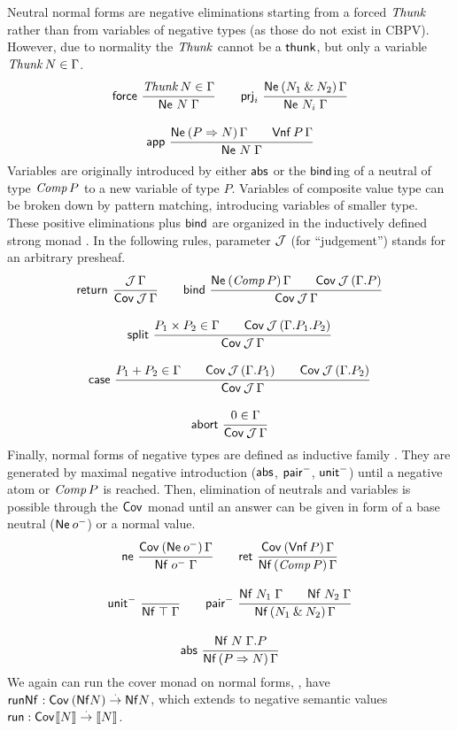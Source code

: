 \documentclass[sigplan,screen,fleqn]{acmart}
\begin{document}
Neutral normal forms  are negative eliminations
starting from a forced $\mathit{Thunk}$ rather than from variables of negative
types (as those do not exist in CBPV).  However, due to normality
the $\mathit{Thunk}$ cannot be a $\mathsf{thunk}$, but only a variable
$\mathit{Thunk}\,N \in \Gamma$.
\begin{gather*}
  \nru{\tforce}{\Thunk N \in \Gamma}{\Ne N \Gamma}
\qquad
  \nru{\tprj_i}
      {\NeP {N_1 \ntimes N_2} \Gamma}
      {\Ne {N_i} \Gamma}
\\[2ex]
  \nru{\tapp}
      {\NeP {P \To N} \Gamma \qquad \PValNf P \Gamma}
      {\Ne N \Gamma}
\end{gather*}
Variables are originally introduced by either $\mathsf{abs}$ or
the $\mathsf{bind}$ing of a neutral of type $\mathit{Comp}\,P$ to a new variable of type
$P$.  Variables of composite value type can be broken down by pattern
matching, introducing variables of smaller type.  These positive
eliminations plus $\mathsf{bind}$ are organized in the
inductively defined strong monad \fbox{$\Cov$}.
In the following rules, parameter $\mathcal{J}$ (for ``judgement'') stands for an
arbitrary presheaf.
\begin{gather*}
  \nru{\treturn}{\J\,\Gamma}{\Cover \J \Gamma}
\qquad
  \nru{\tbind}
      {\NeP {\Comp P} \Gamma \qquad \Cover \J (\cext \Gamma P)}
      {\Cover \J \Gamma}
\\[2ex]
  \nru{\tsplit}
      {P_1 \times P_2 \in \Gamma \qquad
       \Cover \J (\cext {\cext \Gamma {P_1}} {P_2})
      }
      {\Cover \J \Gamma}
\\[2ex]
  \nru{\tcase}
      {P_1 + P_2 \in \Gamma
       \qquad \Cover \J (\cext \Gamma {P_1})
       \qquad \Cover \J (\cext \Gamma {P_2})
      }
      {\Cover \J \Gamma}
\\[2ex]
  \nru{\tabort}
      {\tyempty \in \Gamma}
      {\Cover \J \Gamma}
\end{gather*}
Finally, normal forms of negative types are defined as inductive
family .  They are generated by maximal negative
introduction ($\mathsf{abs}$, $\mathsf{pair}^-$, $\mathsf{unit}^-$) until a negative atom or
$\mathit{Comp}\,P$ is reached.  Then, elimination of neutrals and variables is
possible through the $\Cov$ monad until an answer can be given in form
of a base neutral ($\mathsf{Ne}^{}\,o^-$) or a normal value.
\begin{gather*}
  \nru{\tne}
      {\CoverP {\tNe\,\natom} \Gamma}
      {\Nf {\natom} \Gamma}
\qquad
  \nru{\tret}
      {\CoverP {\tVNf\,P}  \Gamma}
      {\NfP {\Comp P} \Gamma}
\\[2ex]
  \nru{\nunit}{}{\Nf \top \Gamma}
\qquad
  \nru{\npair}
      {\Nf {N_1} \Gamma \qquad \Nf {N_2} \Gamma}
      {\NfP {N_1 \ntimes N_2} \Gamma}
\\[2ex]
  \nru{\tabs}
      {\Nf N {\cext \Gamma P}}
      {\NfP {P \To N} \Gamma}
\end{gather*}
We again can run the cover monad on normal forms, \ie, have
$\mathsf{runNf}^{} : \mathsf{Cov}^{}\,(\mathsf{Nf} N) \stackrel{\cdot}{\to} \mathsf{Nf} N$, which extends to
negative semantic values
$\mathsf{run} : \mathsf{Cov}^{} \mathopen{{[\kern-0.14em[}} N \mathclose{{]\kern-0.14em]}} \stackrel{\cdot}{\to} \mathopen{{[\kern-0.14em[}} N \mathclose{{]\kern-0.14em]}}$.
\end{document}
